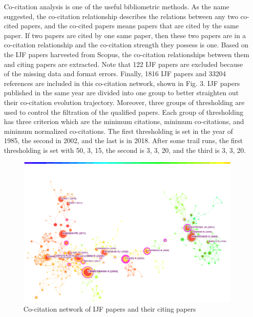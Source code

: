 \documentclass[11pt,a4paper]{elsarticle} %
\begin{document}
Co-citation analysis is one of the useful bibliometric methods. As the
name suggested, the co-citation relationship describes the relations
between any two co-cited papers, and the co-cited papers means papers
that are cited by the same paper. If two papers are cited by one same
paper, then these two papers are in a co-citation relationship and the
co-citation strength they possess is one. Based on the IJF papers
harvested from Scopus, the co-citation relationships between them and
citing papers are extracted. Note that 122 IJF papers are excluded
because of the missing data and format errors. Finally, 1816 IJF papers
and 33204 references are included in this co-citation network, shown in
Fig. 3. IJF papers published in the same year are divided into one group
to better straighten out their co-citation evolution trajectory.
Moreover, three groups of thresholding are used to control the
filtration of the qualified papers. Each group of thresholding has three
criterion which are the minimum citations, minimum co-citations, and
minimum normalized co-citations. The first thresholding is set in the
year of 1985, the second in 2002, and the last is in 2018. After some
trail runs, the first thresholding is set with 50, 3, 15, the second is
3, 3, 20, and the third is 3, 3, 20.

\begin{figure}[!htbp]
\centering
\includegraphics[scale=0.4]{fig.3.eps}
\caption{Co-citation network of IJF papers and their citing papers}
\end{figure}
\end{document}
